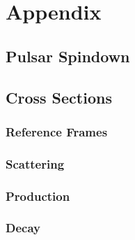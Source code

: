\chapter*{Appendix}
\label{ch:appendix}

\section{Pulsar Spindown}

\section{Cross Sections}

\subsection*{Reference Frames}

\subsection*{Scattering}

\subsection*{Production}

\subsection*{Decay}
